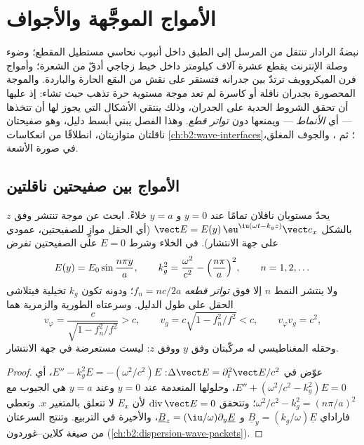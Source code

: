 \chapter{الأمواج الموجَّهة والأجواف}\label{ch:b2:guided-waves}

نبضةُ الرادار تنتقل من المرسل إلى الطبق داخل أنبوب نحاسي مستطيل
المقطع؛ وضوء وصلة الإنترنت يقطع عشرة آلاف كيلومتر داخل خيط زجاجي
أدقّ من الشعرة؛ وأمواج فرن الميكروويف ترتدّ بين جدرانه فتستقر على
نقش من البقع الحارة والباردة. والموجة المحصورة بجدران ناقلة أو
كاسرة لم تعد موجة مستوية حرة تذهب حيث تشاء: إذ عليها أن تحقق
الشروط الحدية على الجدران، وذلك ينتقي الأشكال التي يجوز لها أن
تتخذها --- أي \emph{الأنماط} --- ويمنعها دون \emph{تواتر قطع}. وهذا
الفصل يبني أبسط دليل، وهو صفيحتان ناقلتان متوازيتان، انطلاقًا من
انعكاسات \cref{ch:b2:wave-interfaces}؛ ثم ،
والجوف المغلق،  في صورة الأشعة.

\section{الأمواج بين صفيحتين ناقلتين}

\begin{proposition}\label{prop:b2:guided-waves:plates}
يحدّ مستويان ناقلان تمامًا عند $y = 0$ و $y = a$ خلاءً. ابحث عن موجة
تنتشر وفق $z$ بالشكل $\vect E = E(y)\,\eu^{\iu(\omega t - k_gz)}
\vect e_x$ (أي الحقل موازٍ للصفيحتين، عمودي على جهة
الانتشار).  في الخلاء وشرط $E = 0$
على الصفيحتين تفرض
\[
E(y) = E_0\sin\frac{n\pi y}a , \qquad
k_g^2 = \frac{\omega^2}{c^2} - \Bigl(\frac{n\pi}a\Bigr)^2 , \qquad n = 1, 2, \dots
\]
ولا ينتشر النمط $n$ إلا فوق \emph{تواتر قطعه} $f_n = nc/2a$؛ ودونه
تكون $k_g$ تخيلية فيتلاشى الحقل على طول الدليل. وسرعتاه
الطورية والزمرية هما
\[
v_\varphi = \frac c{\sqrt{1 - f_n^2/f^2}} > c , \qquad
v_g = c\sqrt{1 - f_n^2/f^2} < c , \qquad v_\varphi v_g = c^2 ,
\]
وحقله المغناطيسي له مركّبتان وفق $y$ ووفق $z$:  ليست مستعرضة في جهة الانتشار.
\end{proposition}

\begin{proof}
عوّض في $\Delta\vect E = \partial_t^2\vect E/c^2$: $E'' - k_g^2E = -(\omega^2/c^2)E$، أي
$E'' + (\omega^2/c^2 - k_g^2)E = 0$، وحلولها المنعدمة عند $y = 0$ وعند
$y = a$ هي الجيوب مع $\omega^2/c^2 - k_g^2 = (n\pi/a)^2$؛ وتتحقق $\operatorname{div}
\vect E = 0$ لأن $E_x$ لا تتعلق بالمتغير $x$. وتعطي فاراداي
$\underline B_y = (k_g/\omega)\underline E$ و $\underline B_z = (\iu/\omega)\partial_y\underline E$، والأخيرة
في التربيع. وتنتج السرعتان من صيغة كلاين--غوردون
 (\cref{ch:b2:dispersion-wave-packets}).
\end{proof}

